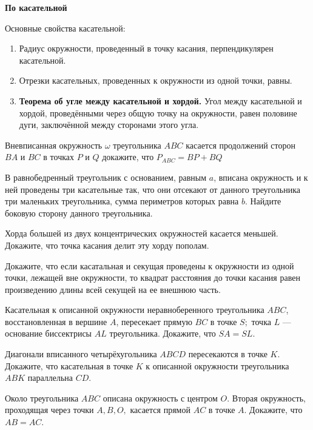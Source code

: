 \centerline{\bf \Huge По касательной}

\begin{flushright}
        \scriptsize{}
\end{flushright}

Основные свойства касательной:

\begin{enumerate}
    \item[(a)] Радиус окружности, проведенный в точку касания, перпендикулярен касательной. 
    
    \item[(b)] Отрезки касательных, проведенных к окружности из одной точки, равны.
    
    \item[(c)] \textbf{Теорема об угле между касательной и хордой.} Угол между касательной и хордой, проведёнными через общую точку на окружности, равен половине дуги, заключённой между сторонами этого угла.
\end{enumerate}

Вневписанная окружность $\omega$ треугольника $ABC$ касается продолжений сторон $BA$ и $BC$ в точках $P$ и $Q$ докажите, что $P_{ABC} = BP + BQ$

В равнобедренный треугольник с основанием, равным $a$, вписана окружность и к ней проведены три касательные так, что они отсекают от данного треугольника три маленьких треугольника, сумма периметров которых равна $b$. Найдите боковую сторону данного треугольника.

Хорда большей из двух концентрических окружностей касается меньшей. Докажите, что точка касания делит эту хорду пополам.

Докажите, что если касатальная и секущая проведены к окружности из одной точки, лежащей вне окружности, то квадрат расстояния до точки касания равен произведению длины всей секущей на ее внешнюю часть.

Касательная к описанной окружности неравноберенного треугольника $ABC$, восстановленная в вершине $A$, пересекает прямую $BC$ в точке $S;$ точка $L$ --- основание биссектрисы $AL$ треугольника. Докажите, что $SA = SL.$

Диагонали вписанного четырёхугольника $ABCD$ пересекаются в точке $K$. Докажите, что касательная в точке $K$ к описанной окружности треугольника $ABK$ параллельна $CD$.

Около треугольника $ABC$ описана окружность с центром $O$. Вторая окружность, проходящая через точки $A, B, O,$ касается прямой $AC$ в точке $A$. Докажите, что $AB = AC.$

